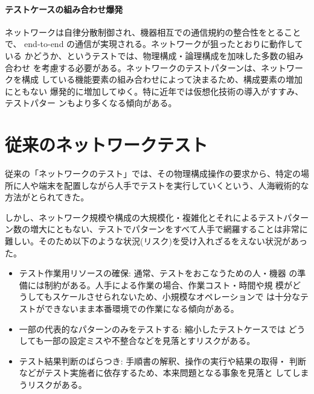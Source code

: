    \paragraph{テストケースの組み合わせ爆発}
ネットワークは自律分散制御され、機器相互での通信規約の整合性をとることで、
end-to-end の通信が実現される。ネットワークが狙ったとおりに動作している
かどうか、というテストでは、物理構成・論理構成を加味した多数の組み合わせ
を考慮する必要がある。ネットワークのテストパターンは、ネットワークを構成
している機能要素の組み合わせによって決まるため、構成要素の増加にともない
爆発的に増加してゆく。特に近年では仮想化技術の導入がすすみ、テストパター
ンもより多くなる傾向がある。

  \section{従来のネットワークテスト}


従来の「ネットワークのテスト」では、その物理構成操作の要求から、特定の場
所に人や端末を配置しながら人手でテストを実行していくという、人海戦術的な
方法がとられてきた。

しかし、ネットワーク規模や構成の大規模化・複雑化とそれによるテストパター
ン数の増大にともない、テストでパターンをすべて人手で網羅することは非常に
難しい。そのため以下のような状況(リスク)を受け入れざるをえない状況があった。
\begin{itemize}
 \item テスト作業用リソースの確保: 通常、テストをおこなうための人・機器
       の準備には制約がある。人手による作業の場合、作業コスト・時間や規
       模がどうしてもスケールさせられないため、小規模なオペレーションで
       は十分なテストができないまま本番環境での作業になる傾向がある。
 \item 一部の代表的なパターンのみをテストする: 縮小したテストケースでは
       どうしても一部の設定ミスや不整合などを見落とすリスクがある。
 \item テスト結果判断のばらつき: 手順書の解釈、操作の実行や結果の取得・
       判断などがテスト実施者に依存するため、本来問題となる事象を見落と
       してしまうリスクがある。
\end{itemize}

